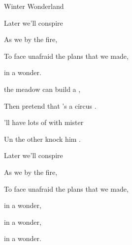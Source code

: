 \begin{SBSong}{Winter Wonderland}
  \begin{SBVerse}
    Later  we'll conspire
    
    As we  by the fire,
    
    To face unafraid the plans that we made,
    
     in a  wonder.
  \end{SBVerse}
  \CBPageBrk
  \begin{SBVerse}
     the meadow  can build a ,
    
    Then pretend that 's a circus .
    
    'll have lots of  with mister 
    
    Un the other  knock him .
  \end{SBVerse}
  \begin{SBVerse}
    Later  we'll conspire
    
    As we  by the fire,
    
    To face unafraid the plans that we made,
    
     in a  wonder,
    
     in a  wonder,

 
     in a  wonder.    
  \end{SBVerse}
\end{SBSong}
